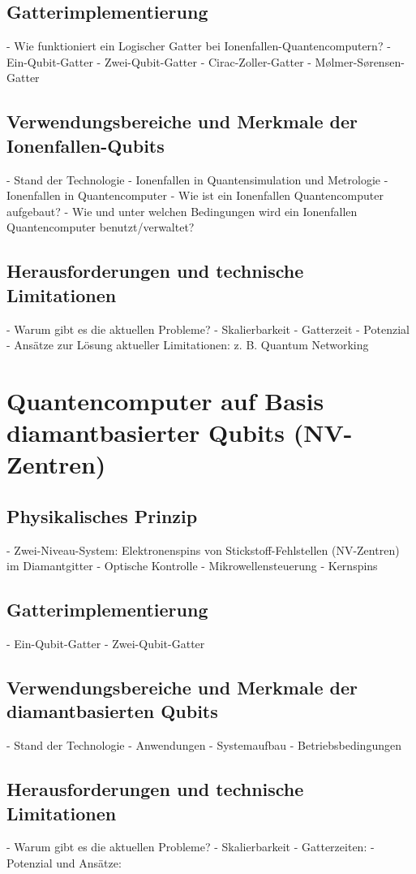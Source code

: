 \subsection{Gatterimplementierung}
    - Wie funktioniert ein Logischer Gatter bei Ionenfallen-Quantencomputern?
    - Ein-Qubit-Gatter
    - Zwei-Qubit-Gatter
    - Cirac-Zoller-Gatter
    - Mølmer-Sørensen-Gatter
\subsection{Verwendungsbereiche und Merkmale der Ionenfallen-Qubits}
    - Stand der Technologie
    - Ionenfallen in Quantensimulation und Metrologie
    - Ionenfallen in Quantencomputer
    - Wie ist ein Ionenfallen Quantencomputer aufgebaut?
    - Wie und unter welchen Bedingungen wird ein Ionenfallen Quantencomputer benutzt/verwaltet?
\subsection{Herausforderungen und technische Limitationen}
    - Warum gibt es die aktuellen Probleme?
    - Skalierbarkeit
    - Gatterzeit
    - Potenzial
    - Ansätze zur Lösung aktueller Limitationen: z. B. Quantum Networking 

\section{Quantencomputer auf Basis diamantbasierter Qubits (NV-Zentren)}
\subsection{Physikalisches Prinzip}
    - Zwei-Niveau-System: Elektronenspins von Stickstoff-Fehlstellen (NV-Zentren) im Diamantgitter
    - Optische Kontrolle
    - Mikrowellensteuerung
    - Kernspins
\subsection{Gatterimplementierung}
    - Ein-Qubit-Gatter
    - Zwei-Qubit-Gatter
\subsection{Verwendungsbereiche und Merkmale der diamantbasierten Qubits}
    - Stand der Technologie
    - Anwendungen
    - Systemaufbau
    - Betriebsbedingungen
\subsection{Herausforderungen und technische Limitationen}
    - Warum gibt es die aktuellen Probleme?
    - Skalierbarkeit
    - Gatterzeiten:
    - Potenzial und Ansätze:



